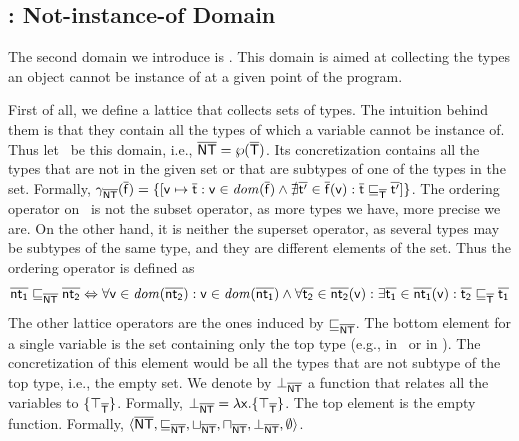 \documentclass{llncs}
\begin{document}


\subsection{\nottype: Not-instance-of Domain}

The second domain we introduce is \nottype. This domain is aimed at collecting the types an object cannot be instance of at a given point of the program.

First of all, we define a lattice that collects sets of types. The intuition behind them is that they contain all the types of which a variable cannot be instance of. Thus let \nottype\ be this domain, i.e., $\mathsf{\overline{NT}}=\wp(\mathsf{\overline{T}})$. Its concretization contains all the types that are not in the given set or that are subtypes of one of the types in the set. Formally, $\gamma_{\mathsf{\overline{NT}}}(\mathsf{\overline{f}})=\{[\mathsf{v} \mapsto \mathsf{\overline{t}} : \mathsf{v} \in \mathit{dom}(\mathsf{\overline{f}}) \land \nexists \mathsf{\overline{t'}} \in \mathsf{\overline{f}}(\mathsf{v}) : \mathsf{\overline{t}} \sqsubseteq_{\mathsf{\overline{T}}} \mathsf{\overline{t'}}]\}$. The ordering operator on \nottype\ is not the subset operator, as more types we have, more precise we are. On the other hand, it is neither the superset operator, as several types may be subtypes of the same type, and they are different elements of the set. Thus the ordering operator is defined as
\[
\mathsf{\overline{nt_1}} \sqsubseteq_{\mathsf{\overline{NT}}} \mathsf{\overline{nt_2}} \Leftrightarrow \forall \mathsf{v} \in \mathit{dom}(\mathsf{\overline{nt_2}}) : \mathsf{v} \in \mathit{dom}(\mathsf{\overline{nt_1}}) \land \forall \mathsf{\overline{t_2}} \in \mathsf{\overline{nt_2}}(\mathsf{v}) : \exists \mathsf{\overline{t_1}} \in \mathsf{\overline{nt_1}}(\mathsf{v}) : \mathsf{\overline{t_2}} \sqsubseteq_{\mathsf{\overline{T}}} \mathsf{\overline{t_1}}
\]
The other lattice operators are the ones induced by $\sqsubseteq_{\mathsf{\overline{NT}}}$. The bottom element for a single variable is the set containing only the top type (e.g.,  in \Java\ or  in \Scala). The concretization of this element would be all the types that are not subtype of the top type, i.e., the empty set. We denote by $\bot_{\mathsf{\overline{NT}}}$ a function that relates all the variables to $\{\top_{\mathsf{\overline{T}}}\}$. Formally, $\bot_{\mathsf{\overline{NT}}} = \lambda \mathsf{x} . \{\top_{\mathsf{\overline{T}}}\}$.  The top element is the empty function. Formally, $\langle \mathsf{\overline{NT}}, \sqsubseteq_{\mathsf{\overline{NT}}}, \sqcup_{\mathsf{\overline{NT}}}, \sqcap_{\mathsf{\overline{NT}}}, \bot_{\mathsf{\overline{NT}}}, \emptyset \rangle$.
\end{document}
